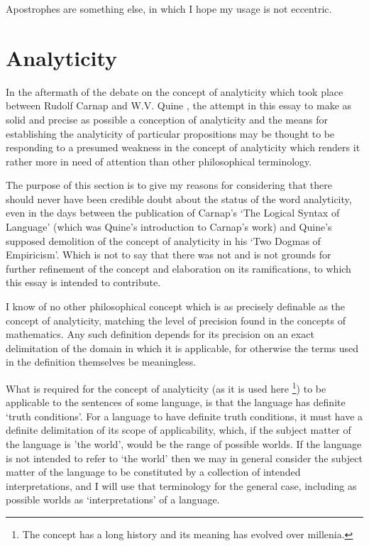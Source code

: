 \documentclass[10pt,titlepage]{article}
\begin{document}
Apostrophes are something else, in which I hope my usage is not eccentric.

\section{Analyticity}

In the aftermath of the debate on the concept of analyticity which took place between Rudolf Carnap and W.V. Quine \cite{carnap90}, the attempt in this essay to make as solid and precise as possible a conception of analyticity and the means for establishing the analyticity of particular propositions may be thought to be responding to a presumed weakness in the concept of analyticity which renders it rather more in need of attention than other philosophical terminology.

The purpose of this section is to give my reasons for considering that there should never have been credible doubt about the status of the word analyticity, even in the days between the publication of Carnap's `The Logical Syntax of Language' (which was Quine's introduction to Carnap's work) and Quine's supposed demolition of the concept of analyticity in his `Two Dogmas of Empiricism'.
Which is not to say that there was not and is not grounds for further refinement of the concept and elaboration on its ramifications, to which this essay is intended to contribute.

I know of no other philosophical concept which is as precisely definable as the concept of analyticity, matching the level of precision found in the concepts of mathematics.
Any such definition depends for its precision on an exact delimitation of the domain in which it is applicable, for otherwise the terms used in the definition themselves be meaningless.

What is required for the concept of analyticity (as it is used here%
\footnote{The concept has a long history and its meaning has evolved over millenia.}) to be applicable to the sentences of some language, is that the language has definite `truth conditions'.
For a language to have definite truth conditions, it must have a definite delimitation of its scope of applicability, which, if the subject matter of the language is 'the world', would be the range of possible worlds.
If the language is not intended to refer to `the world' then we may in general consider the subject matter of the language to be constituted by a collection of intended interpretations, and I will use that terminology for the general case, including as possible worlds as `interpretations' of a language.
\end{document}
